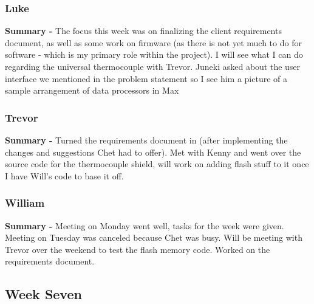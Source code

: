 \documentclass[onecolumn, draftclsnofoot,10pt, compsoc]{IEEEtran}
\begin{document}
\subsubsection*{Luke}
    \begin{adjustwidth}{2.5em}{0pt}
    \textbf{Summary -} The focus this week was on finalizing the client requirements document, as well as some work on firmware (as there is not yet much to do for software - which is my primary role within the project). I will see what I can do regarding the universal thermocouple with Trevor. Juneki asked about the user interface we mentioned in the problem statement so I see him a picture of a sample arrangement of data processors in Max    
    \end{adjustwidth}
\subsubsection*{Trevor}
    \begin{adjustwidth}{2.5em}{0pt}
    \textbf{Summary -} Turned the requirements document in (after implementing the changes and suggestions Chet had to offer). Met with Kenny and went over the source code for the thermocouple shield, will work on adding flash stuff to it once I have Will's code  to base it off.
    \end{adjustwidth}
\subsubsection*{William}
    \begin{adjustwidth}{2.5em}{0pt}
    \textbf{Summary -} Meeting on Monday went well, tasks for the week were given. Meeting on Tuesday was canceled because Chet was busy. Will be meeting with Trevor over the weekend to test the flash memory code. Worked on the requirements document.
    \end{adjustwidth}



\subsection{Week Seven}
\end{document}
